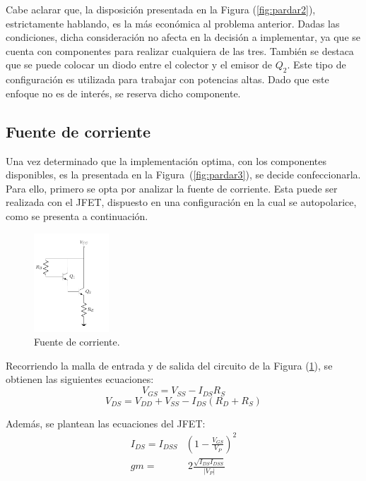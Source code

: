 Cabe aclarar que, la disposición presentada en la Figura (\ref{fig:pardar2}), estrictamente hablando, es la más económica al problema anterior. Dadas las condiciones, dicha consideración no afecta en la decisión a implementar, ya que se cuenta con componentes para realizar cualquiera de las tres. También se destaca que se puede colocar un diodo entre el colector y el emisor de $Q_2$. Este tipo de configuración es utilizada para trabajar con potencias altas. Dado que este enfoque no es de interés, se reserva dicho componente.

\subsection{Fuente de corriente}
\label{subsec:fdei}
Una vez determinado que la implementación optima, con los componentes disponibles, es la presentada en la Figura~(\ref{fig:pardar3}), se decide confeccionarla. Para ello, primero se opta por analizar la fuente de corriente. Esta puede ser realizada con el JFET, dispuesto en una configuración en la cual se autopolarice, como se presenta a continuación.
\begin{figure}[H]
\centering
	\includegraphics[width=0.25\textwidth, page=4]{Imagenes/ParDarlington.pdf}
	\caption{Fuente de corriente.}
	\label{fig:fuentei}
\end{figure}

Recorriendo la malla de entrada y de salida del circuito de la Figura (\ref{fig:fuentei}), se obtienen las siguientes ecuaciones:
\begin{equation}
	V_{GS} = V_{SS} - I_{DS} R_{S}
\end{equation}
\begin{equation}
	V_{DS} = V_{DD} + V_{SS} - I_{DS} \left( R_{D} + R_{S} \right)
\end{equation}

Además, se plantean las ecuaciones del JFET:
\begin{equation}
\begin{split}
	I_{DS} = I_{DSS} & \left( 1 - \frac{V_{GS}}{V_P} \right)^2 \\
	gm = & \ 2\frac{\sqrt{I_{DS} I_{DSS}}}{|V_P|}
\end{split}
\end{equation}

